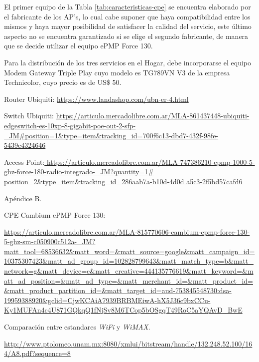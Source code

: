 El primer equipo de la Tabla \ref{tab:caracteristicas-cpe} se encuentra elaborado por el fabricante de los AP's, lo cual cabe suponer que haya compatibilidad entre los mismos y haya mayor posibilidad de satisfacer la calidad del servicio, este último aspecto no se encuentra garantizado si se elige el segundo fabricante, de manera que se decide utilizar el equipo ePMP Force 130.

Para la distribución de los tres servicios en el Hogar, debe incorporarse el equipo Modem Gateway Triple Play cuyo modelo es TG789VN V3 de la empresa Technicolor, cuyo precio es de US\$ 50.



\newpage






\begin{thebibliography}{99}

 Router Ubiquiti: {\tiny \url{https://www.landashop.com/ubn-er-4.html}}


 Switch Ubiquiti: {\tiny \url{https://articulo.mercadolibre.com.ar/MLA-861437448-ubiquiti-edgeswitch-es-10xp-8-gigabit-poe-out-2-sfp-_JM#position=1&type=item&tracking_id=700f6c13-dbd7-432f-98fe-5439c4324646}}



Access Point:{\tiny \url{ https://articulo.mercadolibre.com.ar/MLA-747386210-epmp-1000-5-ghz-force-180-radio-integrado-_JM?quantity=1# position=2&type=item&tracking_id=286aab7a-b10d-4d0d a5c3-2f5bd57cafd6}}


 Apéndice B.

CPE Cambium ePMP Force 130: \begin{tiny}
\url{https://articulo.mercadolibre.com.ar/MLA-815770606-cambium-epmp-force-130-5-ghz-sm-c050900c512a-_JM?matt_tool=68536632&matt_word=&matt_source=google&matt_campaign_id=10375307423&matt_ad_group_id=102828799643&matt_match_type=b&matt_network=g&matt_device=c&matt_creative=444135776619&matt_keyword=&matt_ad_position=&matt_ad_type=&matt_merchant_id=&matt_product_id=&matt_product_partition_id=&matt_target_id=aud-753845548730:dsa-19959388920&gclid=CjwKCAiA7939BRBMEiwA-hX5J36c9bxCCu-Ky1MUFAn4c4U871GQkqQ1fNjSv8M6TCop5bOSgqT49RoC5aYQAvD_BwE}
\end{tiny}


 Comparación entre estandares \textit{WiFi} y \textit{WiMAX}. \begin{tiny}
\url{http://www.ptolomeo.unam.mx:8080/xmlui/bitstream/handle/132.248.52.100/164/A8.pdf?sequence=8}
\end{tiny}

\end{thebibliography}

\newpage